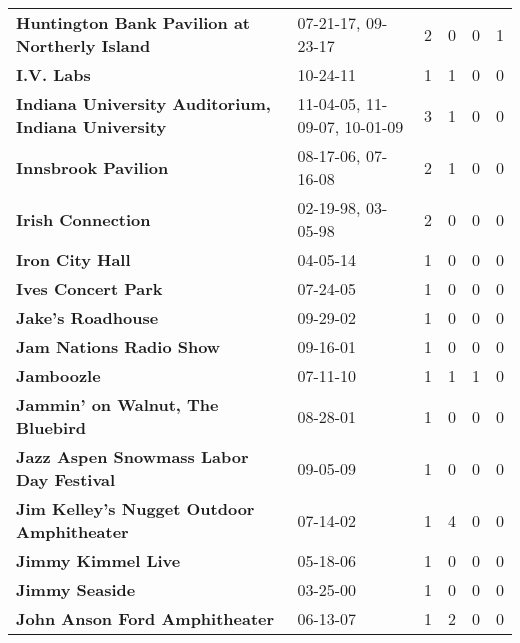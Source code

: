 \begin{supertabular}{llllll}
                \textbf{Huntington Bank Pavilion at Northerly Island} &            07-21-17, 09-23-17 &  2 &   0 &  0 &  1 \\
                                                   \textbf{I.V. Labs} &                      10-24-11 &  1 &   1 &  0 &  0 \\
           \textbf{Indiana University Auditorium, Indiana University} &  11-04-05, 11-09-07, 10-01-09 &  3 &   1 &  0 &  0 \\
                                          \textbf{Innsbrook Pavilion} &            08-17-06, 07-16-08 &  2 &   1 &  0 &  0 \\
                                            \textbf{Irish Connection} &            02-19-98, 03-05-98 &  2 &   0 &  0 &  0 \\
                                              \textbf{Iron City Hall} &                      04-05-14 &  1 &   0 &  0 &  0 \\
                                           \textbf{Ives Concert Park} &                      07-24-05 &  1 &   0 &  0 &  0 \\
                                            \textbf{Jake's Roadhouse} &                      09-29-02 &  1 &   0 &  0 &  0 \\
                                      \textbf{Jam Nations Radio Show} &                      09-16-01 &  1 &   0 &  0 &  0 \\
                                                   \textbf{Jamboozle} &                      07-11-10 &  1 &   1 &  1 &  0 \\
                             \textbf{Jammin' on Walnut, The Bluebird} &                      08-28-01 &  1 &   0 &  0 &  0 \\
                      \textbf{Jazz Aspen Snowmass Labor Day Festival} &                      09-05-09 &  1 &   0 &  0 &  0 \\
                    \textbf{Jim Kelley's Nugget Outdoor Amphitheater} &                      07-14-02 &  1 &   4 &  0 &  0 \\
                                           \textbf{Jimmy Kimmel Live} &                      05-18-06 &  1 &   0 &  0 &  0 \\
                                               \textbf{Jimmy Seaside} &                      03-25-00 &  1 &   0 &  0 &  0 \\
                                \textbf{John Anson Ford Amphitheater} &                      06-13-07 &  1 &   2 &  0 &  0 \\

\end{supertabular}

